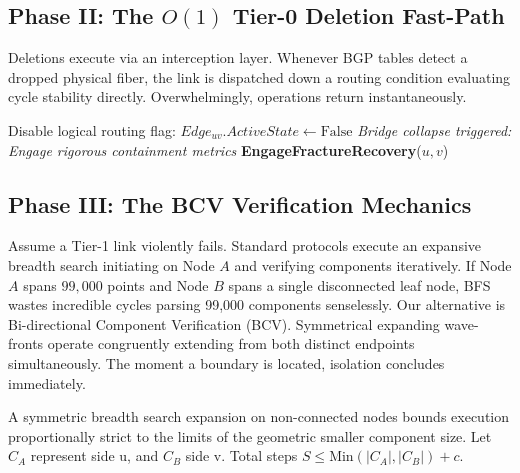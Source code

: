 \documentclass[runningheads]{llncs}
\begin{document}
\subsection{Phase II: The $O(1)$ Tier-0 Deletion Fast-Path}
Deletions execute via an interception layer. Whenever BGP tables detect a dropped physical fiber, the link is dispatched down a routing condition evaluating cycle stability directly. Overwhelmingly, operations return instantaneously.

\begin{algorithm}[H]
\caption{Dynamic Asynchronous Fast-Path Deletion}\label{alg:fastdel}
\begin{algorithmic}[1]
    \State Disable logical routing flag: $Edge_{uv}.ActiveState \gets \text{False}$
        \State \Return {}
    \EndIf
    \State \textit{Bridge collapse triggered: Engage rigorous containment metrics}
    \State \textbf{EngageFractureRecovery}($u, v$) 
\EndProcedure
\end{algorithmic}
\end{algorithm}

\subsection{Phase III: The BCV Verification Mechanics}
Assume a Tier-1 link violently fails. Standard protocols execute an expansive breadth search initiating on Node $A$ and verifying components iteratively. If Node $A$ spans $99,000$ points and Node $B$ spans a single disconnected leaf node, BFS wastes incredible cycles parsing 99,000 components senselessly. 
Our alternative is Bi-directional Component Verification (BCV). Symmetrical expanding wave-fronts operate congruently extending from both distinct endpoints simultaneously. The moment a boundary is located, isolation concludes immediately.

\begin{theorem}
A symmetric breadth search expansion on non-connected nodes bounds execution proportionally strict to the limits of the geometric smaller component size. Let $C_A$ represent side u, and $C_B$ side v. Total steps $S \le \text{Min}(|C_A|, |C_B|) + c$.
\end{theorem}
\end{document}
